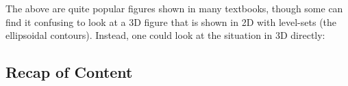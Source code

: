 \documentclass[
  letterpaper,
  DIV=11,
  numbers=noendperiod]{scrreport}
\begin{document}
The above are quite popular figures shown in many textbooks, though some
can find it confusing to look at a 3D figure that is shown in 2D with
level-sets (the ellipsoidal contours). Instead, one could look at the
situation in 3D directly:

\begin{figure}

\begin{minipage}[t]{0.50\linewidth}

{\centering 


}

\end{minipage}%
%
\begin{minipage}[t]{0.50\linewidth}

{\centering 


}

\end{minipage}%

\end{figure}

\hypertarget{recap-of-content}{%
\subsection{Recap of Content}\label{recap-of-content}}
\end{document}
